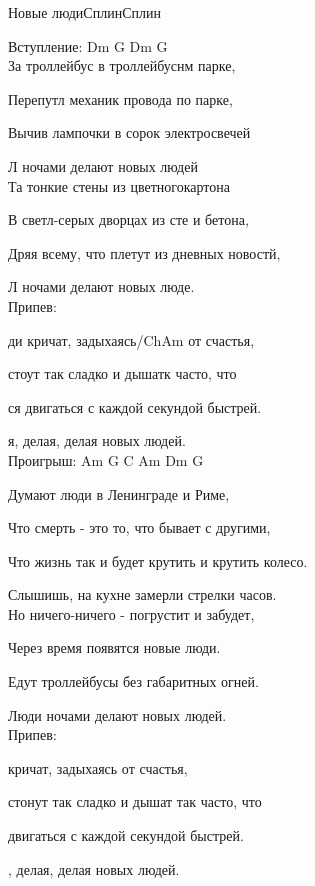 \documentclass[11pt,a5paper]{book}
\renewcommand{\tt}{\indent \indent}
\begin{document}
\begin{song}{Новые люди}{}{Сплин}{Сплин}{}{}

Вступление: Dm G Dm G\\

За троллейбус в троллейбуснм парке,\par
Перепутл механик провода по парке,\par
Вычив лампочки в сорок электросвечей\par
Л ночами делают новых людей\\

Та тонкие стены из цветногокартона\par
В светл-серых дворцах из сте и бетона,\par
Дряя всему, что плетут из дневных новостй,\par
Л ночами делают новых люде.\\

Припев:\par
{}ди кричат, задыхаясь/Ch{Am}{ от} счастья,\par
{} стоут так сладко и дышатк часто, что\par
{}ся двигаться с каждой секундой быстрей.  \par
{}я, делая, делая новых людей. \\

Проигрыш:  Am G C Am Dm G\\


\newpage

Думают люди в Ленинграде и Риме,\par
Что смерть - это то, что бывает с другими,\par 
Что жизнь так и будет крутить и крутить колесо.\par
Слышишь, на кухне замерли стрелки часов.\\

Но ничего-ничего - погрустит и забудет,\par
Через время появятся новые люди.\par
Едут троллейбусы без габаритных огней.\par
Люди ночами делают новых людей.\\

Припев:\par
{} кричат, задыхаясь от счастья,\par
{} стонут так сладко и дышат так часто, что\par
{} двигаться с каждой секундой быстрей.\par
{}, делая, делая новых людей.\\


\end{song}
\end{document}
